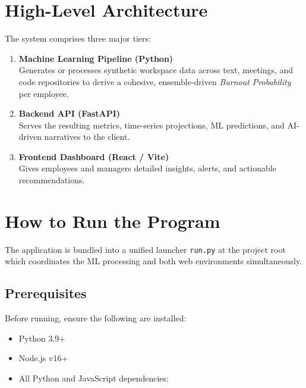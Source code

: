 \documentclass[12pt, a4paper, oneside]{report}
\begin{document}
\section{High-Level Architecture}
\label{sec:architecture}

The system comprises three major tiers:

\begin{enumerate}[label=\textbf{\arabic*.}]
    \item \textbf{Machine Learning Pipeline (Python)}\\
        Generates or processes synthetic workspace data across text, meetings, and code repositories to derive a cohesive, ensemble-driven \emph{Burnout Probability} per employee.

    \item \textbf{Backend API (FastAPI)}\\
        Serves the resulting metrics, time-series projections, ML predictions, and AI-driven narratives to the client.

    \item \textbf{Frontend Dashboard (React / Vite)}\\
        Gives employees and managers detailed insights, alerts, and actionable recommendations.
\end{enumerate}

\section{How to Run the Program}
\label{sec:running}

The application is bundled into a unified launcher \texttt{run.py} at the project root which coordinates the ML processing and both web environments simultaneously.

\subsection{Prerequisites}

Before running, ensure the following are installed:

\begin{itemize}
    \item Python 3.9+
    \item Node.js v16+
    \item All Python and JavaScript dependencies:
\end{itemize}
\end{document}
